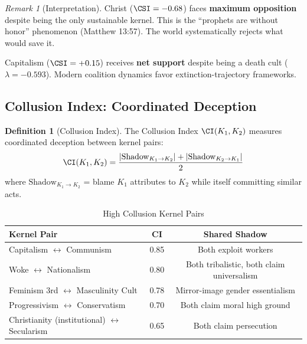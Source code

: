 \documentclass[11pt,a4paper]{article}
\theoremstyle{definition}
\newtheorem{definition}[theorem]{Definition}
\theoremstyle{remark}
\newtheorem{remark}{Remark}
\begin{document}
\begin{remark}[Interpretation]
Christ ($\CSI = -0.68$) faces \textbf{maximum opposition} despite being the only sustainable kernel. This is the ``prophets are without honor'' phenomenon (Matthew 13:57). The world systematically rejects what would save it.

Capitalism ($\CSI = +0.15$) receives \textbf{net support} despite being a death cult ($\lambda = -0.593$). Modern coalition dynamics favor extinction-trajectory frameworks.
\end{remark}

\subsection{Collusion Index: Coordinated Deception}

\begin{definition}[Collusion Index]
\label{def:collusion}
The Collusion Index $\CI(K_1, K_2)$ measures coordinated deception between kernel pairs:
\begin{equation}
    \CI(K_1, K_2) = \frac{|\text{Shadow}_{K_1 \to K_2}| + |\text{Shadow}_{K_2 \to K_1}|}{2}
    \label{eq:collusion}
\end{equation}
where $\text{Shadow}_{K_1 \to K_2}$ = blame $K_1$ attributes to $K_2$ while itself committing similar acts.
\end{definition}

\begin{table}[H]
\centering
\caption{High Collusion Kernel Pairs}
\label{tab:collusion-pairs}
\begin{tabular}{@{}lcc@{}}
\toprule
\textbf{Kernel Pair} & \textbf{CI} & \textbf{Shared Shadow} \\
\midrule
Capitalism $\leftrightarrow$ Communism & 0.85 & Both exploit workers \\
Woke $\leftrightarrow$ Nationalism & 0.80 & Both tribalistic, both claim universalism \\
Feminism 3rd $\leftrightarrow$ Masculinity Cult & 0.78 & Mirror-image gender essentialism \\
Progressivism $\leftrightarrow$ Conservatism & 0.70 & Both claim moral high ground \\
Christianity (institutional) $\leftrightarrow$ Secularism & 0.65 & Both claim persecution \\
\bottomrule
\end{tabular}
\end{table}
\end{document}
